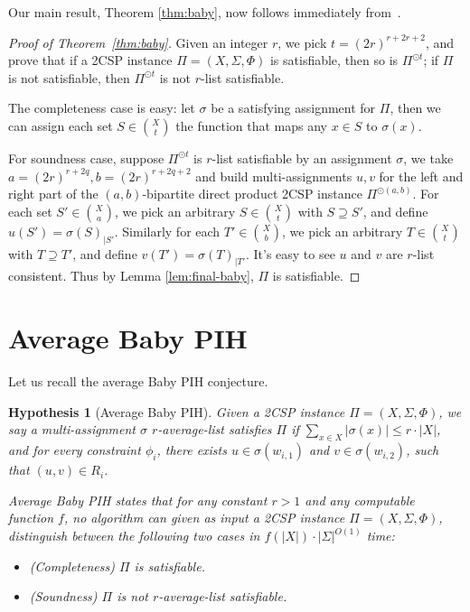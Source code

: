 \documentclass[10pt,a4paper]{article}
\newtheorem{hypothesis}[theorem]{Hypothesis}
\begin{document}
\noindent
Our main result, Theorem \ref{thm:baby}, now follows immediately from~.

\begin{proof}[Proof of Theorem~\ref{thm:baby}]
    Given an integer $r$, we pick $t=(2r)^{r+2r+2}$, and prove that if a 2CSP instance $\Pi=(X,\Sigma,\Phi)$ is satisfiable, then so is $\Pi^{\odot t}$; if $\Pi$ is not satisfiable, then $\Pi^{\odot t}$ is not $r$-list satisfiable.

    The completeness case is easy: let $\sigma$ be a satisfying assignment for $\Pi$, then we can assign each set $S \in \binom{X}{t}$ the function that maps any $x \in S$ to $\sigma(x)$.

    For soundness case, suppose $\Pi^{\odot t}$ is $r$-list satisfiable by an assignment $\sigma$, we take $a=(2r)^{r+2q}, b=(2r)^{r+2q+2}$ and build multi-assignments $u,v$ for the left and right part of the $(a,b)$-bipartite direct product 2CSP instance $\Pi^{\odot(a,b)}$. For each set $S' \in \binom{X}{a}$, we pick an arbitrary $S \in \binom{X}{t}$ with $S \supseteq S'$, and define $u(S')=\sigma(S)_{|S'}$. Similarly for each $T'\in \binom{X}{b}$, we pick an arbitrary $T \in \binom{X}{t}$ with $T \supseteq T'$, and define $v(T')=\sigma(T)_{|T'}$. It's easy to see $u$ and $v$ are $r$-list consistent. Thus by Lemma \ref{lem:final-baby}, $\Pi$ is satisfiable.
\end{proof}

\section{Average Baby PIH}
\label{sec:avg}

\noindent Let us recall the average Baby PIH conjecture. 
\begin{hypothesis}[Average Baby PIH]
    Given a 2CSP instance $\Pi=(X,\Sigma,\Phi)$, we say a multi-assignment $\sigma$ $r$-average-list satisfies $\Pi$ if $\sum_{x \in X}|\sigma(x)|\le r\cdot |X|$, and for every constraint $\phi_i$, there exists $u \in \sigma(w_{i,1})$ and $v \in \sigma(w_{i,2})$, such that $(u,v) \in R_i$.

    Average Baby PIH states that for any constant $r>1$ and any computable function $f$, no algorithm can given as input a 2CSP instance $\Pi=(X,\Sigma,\Phi)$, distinguish between the following two cases in $f(|X|)\cdot |\Sigma|^{O(1)}$ time:
    \begin{itemize}
        \item (Completeness) $\Pi$ is satisfiable.
        \item (Soundness) $\Pi$ is not $r$-average-list satisfiable.
    \end{itemize}
\end{hypothesis}
\end{document}
